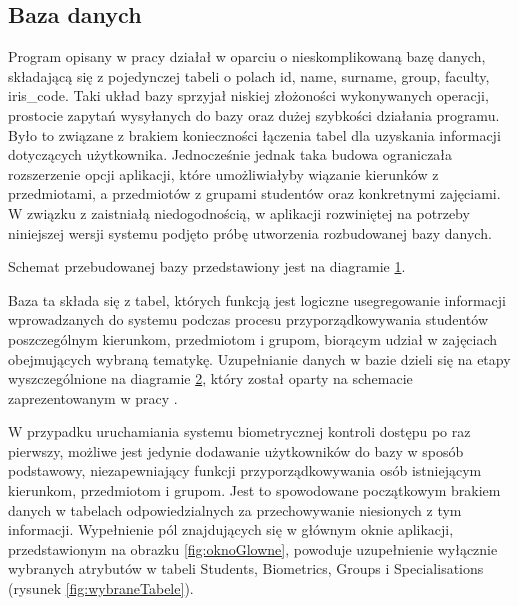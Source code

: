 \subsection{Baza danych}
\label{subsec:baza}

Program opisany w pracy \cite{Gl11} działał w oparciu o nieskomplikowaną bazę danych, składającą się z pojedynczej tabeli o polach id, name, surname, group, faculty, iris\_code. Taki układ bazy sprzyjał niskiej złożoności wykonywanych operacji, prostocie zapytań wysyłanych do bazy oraz dużej szybkości działania programu. Było to związane z brakiem konieczności łączenia tabel dla uzyskania informacji dotyczących użytkownika. Jednocześnie jednak taka budowa ograniczała rozszerzenie opcji aplikacji, które umożliwiałyby wiązanie kierunków z przedmiotami, a przedmiotów z grupami studentów oraz konkretnymi zajęciami. W związku z zaistniałą niedogodnością, w aplikacji rozwiniętej na potrzeby niniejszej wersji systemu podjęto próbę utworzenia rozbudowanej bazy danych.

Schemat przebudowanej bazy przedstawiony jest na diagramie \ref{fig:bazaDanych}.

 
\begin{figure}
\label{fig:bazaDanych}
\end{figure}

Baza ta składa się z tabel, których funkcją jest logiczne usegregowanie informacji wprowadzanych do systemu podczas procesu przyporządkowywania studentów poszczególnym kierunkom, przedmiotom i grupom, biorącym udział w zajęciach obejmujących wybraną tematykę. Uzupełnianie danych w bazie dzieli się na etapy wyszczególnione na diagramie \ref{fig:etapyDzialania}, który został oparty na schemacie zaprezentowanym w pracy \cite{Gl11}.

\begin{figure}
\label{fig:etapyDzialania}
\end{figure}

W przypadku uruchamiania systemu biometrycznej kontroli dostępu po raz pierwszy, możliwe jest jedynie dodawanie użytkowników do bazy w sposób podstawowy, niezapewniający funkcji przyporządkowywania osób istniejącym kierunkom, przedmiotom i grupom. Jest to spowodowane początkowym brakiem danych w tabelach odpowiedzialnych za przechowywanie niesionych z tym informacji. Wypełnienie pól znajdujących się w głównym oknie aplikacji, przedstawionym na obrazku \ref{fig:oknoGlowne}, powoduje uzupełnienie wyłącznie wybranych atrybutów w tabeli Students, Biometrics, Groups i Specialisations (rysunek \ref{fig:wybraneTabele}). 

